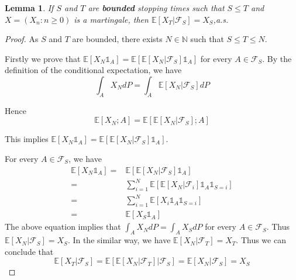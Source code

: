 \documentclass{article}
\newtheorem{lemma}[theorem]{Lemma}
\begin{document}
\begin{lemma}
  If $S$ and $T$ are \textbf{bounded} stopping times such that $S\leq T$ and $X=(X_n:n\geq 0)$ is a martingale, then $\mathbb{E}[X_T|\mathcal{F}_S]=X_S$,a.s.
\end{lemma}

\begin{proof}
As $S$ and $T$ are bounded, there exists $N\in\mathbb{N}$ such that $S\leq T\leq N$.

Firstly we prove that $\mathbb{E}[X_N\mathbb{1}_A]=\mathbb{E}\left[\mathbb{E}\left[X_N|\mathcal{F}_S\right]\mathbb{1}_A\right]$ for every $A\in\mathcal{F}_S$. By the definition of the conditional expectation, we have
$$\int_{A}X_NdP=\int_{A}\mathbb{E}[X_N|\mathcal{F}_S]dP$$

Hence
$$\mathbb{E}[X_N;A]=\mathbb{E}\left[\mathbb{E}\left[X_N|\mathcal{F}_S\right];A\right]$$

This implies $\mathbb{E}[X_N\mathbb{1}_A]=\mathbb{E}\left[\mathbb{E}\left[X_N|\mathcal{F}_S\right]\mathbb{1}_A\right]$.

For every $A\in\mathcal{F}_S$, we have
\begin{equation*}
    \begin{array}{rl}
    \mathbb{E}[X_N\mathbb{1}_A]
    =& \mathbb{E}\left[\mathbb{E}\left[X_N|\mathcal{F}_S\right]\mathbb{1}_A\right] \\
    =& \sum\limits_{i=1}^N \mathbb{E}\left[\mathbb{E}\left[X_N|\mathcal{F}_i\right]\mathbb{1}_A\mathbb{1}_{S=i}\right] \\
    =& \sum\limits_{i=1}^N \mathbb{E}\left[X_i\mathbb{1}_A\mathbb{1}_{S=i}\right] \\
    =& \mathbb{E}\left[X_S\mathbb{1}_A\right]
    \end{array}
\end{equation*}
The above equation implies that $\int_{A}X_NdP=\int_{A}X_SdP$ for every $A\in\mathcal{F}_S$. Thus $\mathbb{E}[X_N|\mathcal{F}_S]=X_S$. In the similar way, we have  $\mathbb{E}[X_N|\mathcal{F}_T]=X_T$. Thus we can conclude that
$$\mathbb{E}[X_T|\mathcal{F}_S]=\mathbb{E}\left[\mathbb{E}\left[X_N|\mathcal{F}_T\right]|\mathcal{F}_S\right]=\mathbb{E}[X_N|\mathcal{F}_S]=X_S$$

\end{proof}
\end{document}
